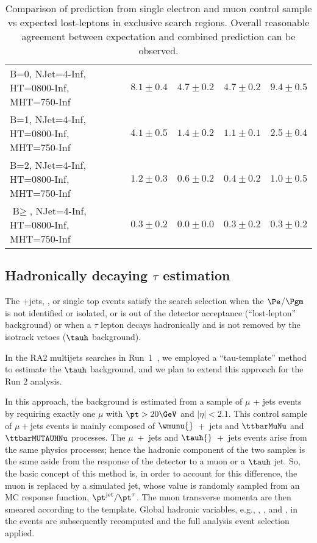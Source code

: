 \begin{table}
\begin{tabular}{l|r|r|r|r}
    B=0, NJet=4-Inf, HT=0800-Inf, MHT=750-Inf &               $8.1\pm0.4$&               $4.7\pm0.2$&               $4.7\pm0.2$&                   $9.4\pm0.5$ \\ 
    B=1, NJet=4-Inf, HT=0800-Inf, MHT=750-Inf &               $4.1\pm0.5$&               $1.4\pm0.2$&               $1.1\pm0.1$&                   $2.5\pm0.4$ \\ 
    B=2, NJet=4-Inf, HT=0800-Inf, MHT=750-Inf &               $1.2\pm0.3$&               $0.6\pm0.2$&               $0.4\pm0.2$&                   $1.0\pm0.5$ \\ 
    $\text{B}\geq$, NJet=4-Inf, HT=0800-Inf, MHT=750-Inf &               $0.3\pm0.2$&               $0.0\pm0.0$&               $0.3\pm0.2$&                   $0.3\pm0.2$ \\ 

    
    \bottomrule 

  \end{tabular}
  \normalsize
  \caption{ Comparison of prediction from single electron and muon control sample vs expected lost-leptons in exclusive search regions. Overall reasonable agreement between expectation and combined prediction can be observed.}
  \label{tab:lost-lepton-searchbin-closure}
\end{table}
\normalsize

\clearpage
\subsection{Hadronically decaying $\tau$ estimation}
\label{sec:hadronic-taus}

% 
% 
The \wlnubr{}+jets, \ttbar{}, or single top events satisfy the search selection when the $\Pe$/$\Pgm$
is not identified or isolated, or is out of the detector acceptance (``lost-lepton'' background)
or when a $\tau$ lepton decays hadronically and is not removed by the isotrack vetoes ($\tauh$ background).

In the RA2 multijets searches in Run~1~\cite{RA28TeVpaper,RA28TeVan,RA2-2011pub,RA2-2010pub},
we employed a ``tau-template'' method to estimate the $\tauh$ background, and we plan to extend
this approach for the Run 2 analysis.

In this approach, the \tauh background is estimated from a sample of $\mu$ + jets events
by requiring exactly one $\mu$ with $\pt>20\GeV$ and $|\eta|<2.1$. 
This control sample of $\mu + $jets events is
mainly composed of $\wmunu{}$~+~jets and $\ttbarMuNu$ and $\ttbarMUTAUHNu$ processes.
The $\mu$~+~jets and $\tauh{}$~+~jets events arise from the same physics processes; hence
the hadronic component of the two samples is the same aside from the response of the 
detector to a muon or a $\tauh$ jet. 
So, the basic concept of this method is, in order to account for this difference,
the muon is replaced by a simulated \tauh jet,
whose \pt value is randomly sampled from an MC response function, $\pt^{\text{jet}}/\pt^\tau$. 
The muon transverse momenta are then smeared according to the template.
Global hadronic variables, e.g., \njets, \HT{}, and \text{\MHT},
in the events are subsequently recomputed and the full analysis event selection applied. 

